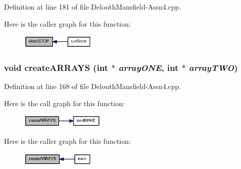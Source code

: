 Definition at line 181 of file DelouthMansfield-\/Assn4.cpp.



Here is the caller graph for this function:\nopagebreak
\begin{figure}[H]
\begin{center}
\leavevmode
\includegraphics[width=100pt]{_delouth_mansfield-_assn4_8cpp_aac62ee236b316f39c25e76417c30c4e7_icgraph}
\end{center}
\end{figure}


\hypertarget{_delouth_mansfield-_assn4_8cpp_a554ac789a02f1a6c2a1340d356ddf18a}{
\subsubsection[{createARRAYS}]{\setlength{\rightskip}{0pt plus 5cm}void createARRAYS (int $\ast$ {\em arrayONE}, \/  int $\ast$ {\em arrayTWO})}}
\label{_delouth_mansfield-_assn4_8cpp_a554ac789a02f1a6c2a1340d356ddf18a}


Definition at line 168 of file DelouthMansfield-\/Assn4.cpp.



Here is the call graph for this function:\nopagebreak
\begin{figure}[H]
\begin{center}
\leavevmode
\includegraphics[width=113pt]{_delouth_mansfield-_assn4_8cpp_a554ac789a02f1a6c2a1340d356ddf18a_cgraph}
\end{center}
\end{figure}




Here is the caller graph for this function:\nopagebreak
\begin{figure}[H]
\begin{center}
\leavevmode
\includegraphics[width=100pt]{_delouth_mansfield-_assn4_8cpp_a554ac789a02f1a6c2a1340d356ddf18a_icgraph}
\end{center}
\end{figure}


